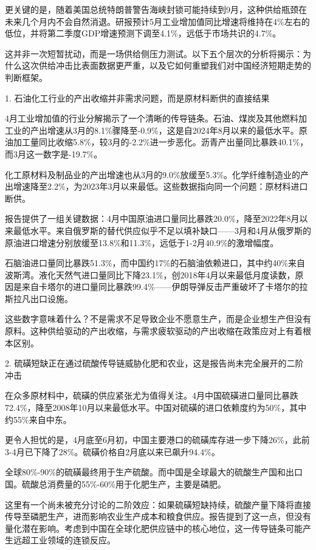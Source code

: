 \documentclass[11pt]{ctexart}
\begin{document}
更关键的是，随着美国总统特朗普警告海峡封锁可能持续到9月，这种供给瓶颈在未来几个月内不会自然消退。研报预计5月工业增加值同比增速将维持在4\%左右的低位，并将第二季度GDP增速预测下调至4.1\%，远低于市场共识的4.7\%。

这并非一次短暂扰动，而是一场供给侧压力测试。以下五个层次的分析将揭示：为什么这次供给冲击比表面数据更严重，以及它如何重塑我们对中国经济短期走势的判断框架。

1. 石油化工行业的产出收缩并非需求问题，而是原材料断供的直接结果

4月工业增加值的行业分解揭示了一个清晰的传导链条。石油、煤炭及其他燃料加工业的产出增速从3月的8.1\%骤降至-0.9\%，这是自2024年8月以来的最低水平。原油加工量同比收缩5.8\%，较3月的-2.2\%进一步恶化。沥青产出量同比暴跌40.1\%，而3月这一数字是-19.7\%。

化工原材料及制品业的产出增速也从3月的9.0\%放缓至5.3\%。化学纤维制造业的产出增速降至2.2\%，为2023年3月以来最低。这些数据指向同一个问题：原材料进口断供。

报告提供了一组关键数据：4月中国原油进口量同比暴跌20.0\%，降至2022年8月以来最低水平。来自俄罗斯的替代供应似乎不足以填补缺口——3月和4月从俄罗斯的原油进口增速分别放缓至13.8\%和11.3\%，远低于1-2月40.9\%的激增幅度。

石脑油进口量同比暴跌51.3\%，而中国约17\%的石脑油依赖进口，其中约40\%来自波斯湾。液化天然气进口量同比下降23.1\%，创2018年4月以来最低月度读数，原因是来自卡塔尔的进口量同比暴跌99.4\%——伊朗导弹反击严重破坏了卡塔尔的拉斯拉凡出口设施。

这些数字意味着什么？不是需求不足导致企业不愿意生产，而是企业想生产但没有原料。这种供给驱动的产出收缩，与需求疲软驱动的产出收缩在政策应对上有着根本区别。

2. 硫磺短缺正在通过硫酸传导链威胁化肥和农业，这是报告尚未完全展开的二阶冲击

在众多原材料中，硫磺的供应紧张尤为值得关注。4月中国硫磺进口量同比暴跌72.4\%，降至2008年10月以来最低水平。中国对硫磺的进口依赖度约为50\%，其中约55\%来自中东。

更令人担忧的是，4月底至6月初，中国主要港口的硫磺库存进一步下降26\%，此前3-4月已下降了28\%。硫磺价格自2月底以来已飙升94.4\%。

全球80\%-90\%的硫磺最终用于生产硫酸。而中国是全球最大的硫酸生产国和出口国。硫酸总消费量的55\%-60\%用于化肥生产，主要是磷肥。

这里有一个尚未被充分讨论的二阶效应：如果硫磺短缺持续，硫酸产量下降将直接传导至磷肥生产，进而影响农业生产成本和粮食供应。报告提到了这一点，但没有量化潜在影响。考虑到中国在全球化肥供应链中的核心地位，这一传导链条可能产生远超工业领域的连锁反应。
\end{document}
